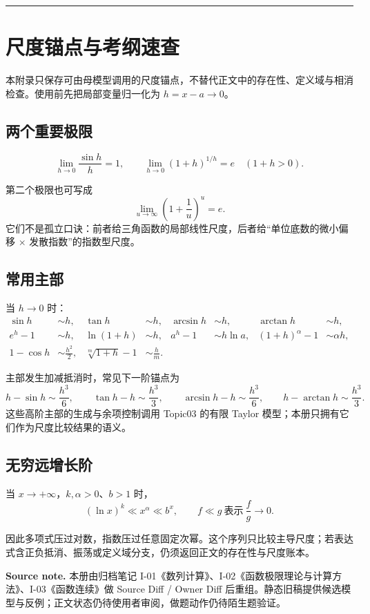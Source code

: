 \documentclass[11pt,a4paper]{ctexart}
\begin{document}
\begin{center}\rule{0.5\linewidth}{0.5pt}\end{center}

\appendix
\section{尺度锚点与考纲速查}

本附录只保存可由母模型调用的尺度锚点，不替代正文中的存在性、定义域与相消检查。使用前先把局部变量归一化为 $h=x-a\to0$。

\subsection{两个重要极限}

\[
\lim_{h\to0}\frac{\sin h}{h}=1,
\qquad
\lim_{h\to0}{(1+h)}^{1/h}=e\quad(1+h>0).
\]

第二个极限也可写成
\[
\lim_{u\to\infty}{\left(1+\frac1u\right)}^u=e.
\]
它们不是孤立口诀：前者给三角函数的局部线性尺度，后者给“单位底数的微小偏移 $\times$ 发散指数”的指数型尺度。

\subsection{常用主部}

当 $h\to0$ 时：
\[
\begin{aligned}
\sin h&\sim h,& \tan h&\sim h,&
\arcsin h&\sim h,& \arctan h&\sim h,\\
e^h-1&\sim h,& \ln(1+h)&\sim h,&
a^h-1&\sim h\ln a,& {(1+h)}^\alpha-1&\sim \alpha h,\\
1-\cos h&\sim \frac{h^2}{2},&
\sqrt[m]{1+h}-1&\sim \frac{h}{m}.&&
\end{aligned}
\]

主部发生加减抵消时，常见下一阶锚点为
\[
h-\sin h\sim\frac{h^3}{6},\qquad
\tan h-h\sim\frac{h^3}{3},\qquad
\arcsin h-h\sim\frac{h^3}{6},\qquad
h-\arctan h\sim\frac{h^3}{3}.
\]
这些高阶主部的生成与余项控制调用 Topic03 的有限 Taylor 模型；本册只拥有它们作为尺度比较结果的语义。

\subsection{无穷远增长阶}

当 $x\to+\infty$，$k,\alpha>0$、$b>1$ 时，
\[
{(\ln x)}^k\ll x^\alpha\ll b^x,
\qquad f\ll g\ \text{表示}\ \frac{f}{g}\to0.
\]

因此多项式压过对数，指数压过任意固定次幂。这个序列只比较主导尺度；若表达式含正负抵消、振荡或定义域分支，仍须返回正文的存在性与尺度账本。

\noindent\textbf{Source note.} 本册由归档笔记 I-01《数列计算》、I-02《函数极限理论与计算方法》、I-03《函数连续》做 Source Diff / Owner Diff 后重组。静态旧稿提供候选模型与反例；正文状态仍待使用者审阅，做题动作仍待陌生题验证。
\end{document}
